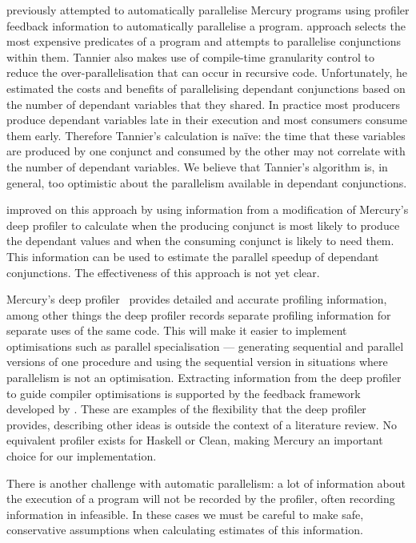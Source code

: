 \citet{tannier:2007:parallel_mercury} previously attempted to automatically
parallelise Mercury programs using profiler feedback
information to automatically parallelise a program.
\citet{tannier:2007:parallel_mercury} approach selects the most expensive predicates
of a program and attempts to parallelise conjunctions within them.
Tannier also makes use of compile-time granularity
control to reduce the over-parallelisation that can occur in recursive
code.
Unfortunately, he estimated the costs and benefits of parallelising
dependant conjunctions based on the number of dependant variables that
they shared.
In practice most producers produce dependant variables late in their
execution and most consumers consume them early.
Therefore Tannier's calculation is na\"ive: the time that these
variables are produced by one conjunct and consumed by the other may
not correlate with the number of dependant variables.
We believe that Tannier's algorithm is, in general, too optimistic
about the parallelism available in dependant conjunctions.

\citet{bone:2008:hons} improved on this approach by using
information from a modification of Mercury's deep profiler to
calculate when the producing conjunct is most likely to produce the
dependant values and when the consuming conjunct is likely to need
them.
This information can be used to estimate the parallel speedup of
dependant conjunctions.
The effectiveness of this approach is not yet clear.

Mercury's deep profiler~\citep{conway:2001:mercury-deep} provides
detailed and accurate profiling information,
among other things the deep profiler records separate profiling
information for separate uses of the same code.
This will make it easier to implement optimisations such as
parallel specialisation --- generating sequential and parallel
versions of one procedure and using the sequential version
in situations where parallelism is not an optimisation.
Extracting information from the deep profiler to guide compiler
optimisations is supported by the feedback framework developed by
\citet{bone:2008:hons}.
These are examples of the flexibility that the deep profiler provides,
describing other ideas is outside the context of a literature review.
No equivalent profiler exists for Haskell or Clean, making Mercury an
important choice for our implementation.

There is another challenge with automatic parallelism: a lot of
information about the execution of a program will not be recorded by the
profiler, often recording information in infeasible.
In these cases we must be careful to make safe, conservative
assumptions when calculating estimates of this information.

